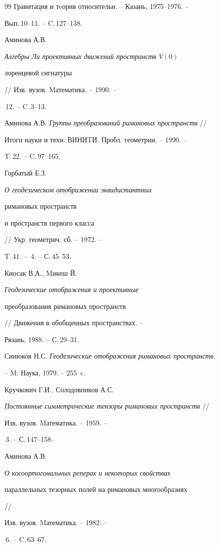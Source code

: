\begin{thebibliography}{99}
Гравитация и тeория относительн. -- Казань, 1975--1976. --


Вып.\,10--11. -- C.\,127--138.




Аминова А.В. {\em Алгебры Ли проективных движений пространств $V(0)$ 


лоренцевой сигнатуры} // Изв. вузов. Mатематика. -- 1990. -- 


\No\,12. -- C.\,3--13.




Аминова А.В. {\em Группы преобразований римановых пространств} //


Итоги науки и техн. ВИНИTИ. Пробл. геометрии. -- 1990. --


T.\,22. -- C.\,97--165.




Горбатый Е.З. {\em О геодезическом отображении эквидистантных


римановых пространств


и пространств первого класса} // Укр. геометрич. сб. -- 1972. --


T.\,41. -- \No\,4. -- С.\,45--53.




Киосак В.А., Mикеш Й. {\em Геодезические отображения и проективные


преобразования римановых пространств}


// Движения в обобщенных пространствах. --


Рязань, 1988. -- С.\,29--31.




Синюков Н.С. {\em Геодезические отображения римановых пространств}.


-- M: Наука, 1979. -- 255~c.




Кручкович Г.И., Солодовников А.С.


{\em Постоянные симметрические тензоры римановых пространств} //


Изв. вузов. Mатематика. -- 1959. --


\No\,3. -- С.\,147--158.




Аминова А.В. {\em О косоортогональных реперах и некоторых свойствах


параллельных тезорных полей на римановых многообразиях} //


Изв. вузов. Mатематика. -- 1982. --


\No\,6. -- C.\,63--67.





\end{thebibliography}





\vskip 0.5cm












\label{end}











